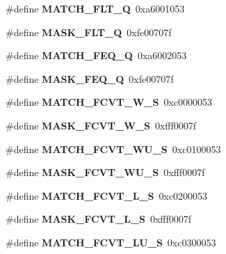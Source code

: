 \begin{DoxyCompactItemize}
\#define {\bfseries M\+A\+T\+C\+H\+\_\+\+F\+L\+T\+\_\+Q}~0xa6001053
\item 
\mbox{\label{riscv-utility_8h_af78baa48ee76ebdf02f4115b369744b4}} 
\#define {\bfseries M\+A\+S\+K\+\_\+\+F\+L\+T\+\_\+Q}~0xfe00707f
\item 
\mbox{\label{riscv-utility_8h_a5549f726bd05b9e620d30cca9e3a2475}} 
\#define {\bfseries M\+A\+T\+C\+H\+\_\+\+F\+E\+Q\+\_\+Q}~0xa6002053
\item 
\mbox{\label{riscv-utility_8h_a70f6f67d573814456cae743f419039d0}} 
\#define {\bfseries M\+A\+S\+K\+\_\+\+F\+E\+Q\+\_\+Q}~0xfe00707f
\item 
\mbox{\label{riscv-utility_8h_aff1567df8ffe2db8f295e5e095253732}} 
\#define {\bfseries M\+A\+T\+C\+H\+\_\+\+F\+C\+V\+T\+\_\+\+W\+\_\+S}~0xc0000053
\item 
\mbox{\label{riscv-utility_8h_a44cd973b3abb52b863158acbdcc3b00b}} 
\#define {\bfseries M\+A\+S\+K\+\_\+\+F\+C\+V\+T\+\_\+\+W\+\_\+S}~0xfff0007f
\item 
\mbox{\label{riscv-utility_8h_a677870da2b23b1f38bdffd67c70a2223}} 
\#define {\bfseries M\+A\+T\+C\+H\+\_\+\+F\+C\+V\+T\+\_\+\+W\+U\+\_\+S}~0xc0100053
\item 
\mbox{\label{riscv-utility_8h_aeafcd9aef650d51c105306b9434bb252}} 
\#define {\bfseries M\+A\+S\+K\+\_\+\+F\+C\+V\+T\+\_\+\+W\+U\+\_\+S}~0xfff0007f
\item 
\mbox{\label{riscv-utility_8h_a980ccadeeff512244b47eeeccef48273}} 
\#define {\bfseries M\+A\+T\+C\+H\+\_\+\+F\+C\+V\+T\+\_\+\+L\+\_\+S}~0xc0200053
\item 
\mbox{\label{riscv-utility_8h_ae0e034338fab4dde69e89eb292e75c5a}} 
\#define {\bfseries M\+A\+S\+K\+\_\+\+F\+C\+V\+T\+\_\+\+L\+\_\+S}~0xfff0007f
\item 
\mbox{\label{riscv-utility_8h_a529945a73ad7c0a718dc01f53ffed6b7}} 
\#define {\bfseries M\+A\+T\+C\+H\+\_\+\+F\+C\+V\+T\+\_\+\+L\+U\+\_\+S}~0xc0300053

\end{DoxyCompactItemize}
